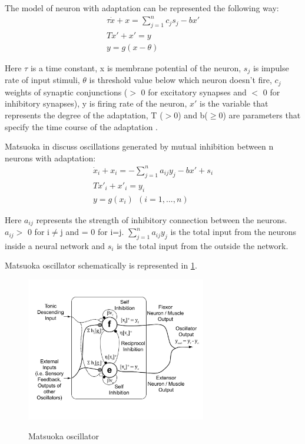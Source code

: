 \documentclass[12pt,a4paper]{report}
\begin{document}
				The model of neuron with adaptation can be represented the following way:
				\begin{equation}\label{eq:Mats1}
					\begin{split}
						\tau \dot{x} + x = \sum^n_{j = 1} c_j s_j - b x \prime\\
						T \dot{x} \prime  + x \prime = y\\
						y = g(x - \theta)
					\end{split}
				\end{equation}
				
				Here $\tau$ is a time constant, x is membrane potential of the neuron, $s_j$ is impulse rate of input stimuli, $\theta$ is threshold value below which neuron doesn't fire, $c_j$ weights of synaptic conjunctions ($>$ 0 for excitatory synapses and $<$ 0 for inhibitory synapses), y is firing rate of the neuron, $x \prime$ is the variable that represents the degree of the adaptation, T ($>$0) and b($\geq 0$) are parameters that specify the time course of the adaptation \cite{matsuoka1985sustained}.
				
				Matsuoka in \cite{matsuoka1985sustained} discuss oscillations generated by mutual inhibition between n neurons with adaptation:
				\begin{equation}\label{eq:Mats2}
					\begin{split}
						\dot{x}_i + x_i = - \sum^n_{j = 1} a_{ij} y_j - b x \prime + s_i\\
						T \dot{x} \prime _i  + x \prime _i= y_i\\
						y = g(x_i)\ \ (i = 1,...,n) 
					\end{split}
				\end{equation}
				
				Here $a_{ij}$ represents the strength of inhibitory connection between the neurons. $a_{ij} >$ 0 for i$\neq$j and = 0 for i=j. $\sum^n_{j = 1} a_{ij} y_j $ is the total input from the neurons inside a neural network and $s_{i}$ is the total input from the outside the network. 
				
				Matsuoka oscillator schematically is represented in \ref{fig:4}.
				\begin{figure}[h!]
					\vspace{-0.2cm}
					\centering
					{\includegraphics[width=0.7\textwidth]{4}}
					\caption{Matsuoka oscillator \cite{liu2008central}}
					\label{fig:4}
					\vspace{-0.1cm}
				\end{figure}
				
\end{document}

